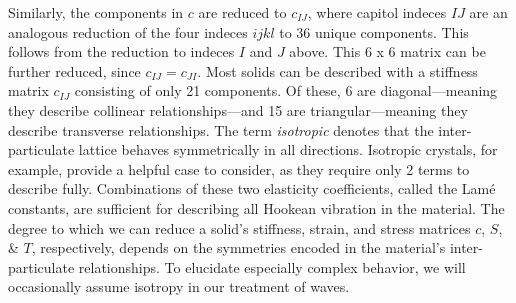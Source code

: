\documentclass[a4paper,10pt]{report}
\numberwithin{equation}{section}
\begin{document}
Similarly, the components in $c$ are reduced to $c_{IJ}$, where capitol indeces
$IJ$ are an analogous reduction of the four indeces $ijkl$ to 36 unique components. This follows from the reduction to indeces $I$ and $J$ above. This 6 x 6 matrix can be further reduced, since $c_{IJ} = c_{JI}$. Most solids can be described with a stiffness matrix $c_{IJ}$ consisting of only 21 components. Of these, 6 are diagonal---meaning they describe collinear relationships---and 15 are triangular---meaning they describe transverse relationships. The term \emph{isotropic} denotes that the inter-particulate lattice behaves symmetrically in all directions. Isotropic crystals, for example, provide a helpful case to consider, as they require only 2 terms to describe fully. Combinations of these two elasticity coefficients, called the Lam\'{e} constants, are sufficient for describing all Hookean vibration in the material. The degree to which we can reduce a solid's stiffness, strain, and stress matrices $c$, $S$, \& $T$, respectively, depends on the symmetries encoded in the material's inter-particulate 
relationships. \cite{Ballantine1997} To elucidate especially complex behavior, we will occasionally assume isotropy in our treatment of waves.
\end{document}
